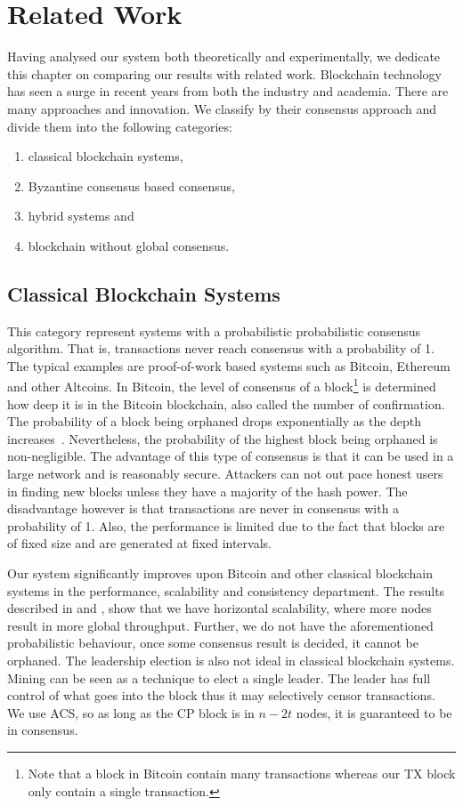 \chapter{Related Work}
\label{ch:related}

Having analysed our system both theoretically and experimentally,
we dedicate this chapter on comparing our results with related work.
Blockchain technology has seen a surge in recent years from both the industry and academia.
There are many approaches and innovation.
We classify by their consensus approach and divide them into the following categories: 
\begin{enumerate}
    \item classical blockchain systems,
    \item Byzantine consensus based consensus,
    \item hybrid systems and
    \item blockchain without global consensus.
\end{enumerate}

\section{Classical Blockchain Systems}
This category represent systems with a probabilistic probabilistic consensus algorithm.
That is, transactions never reach consensus with a probability of 1.
The typical examples are proof-of-work based systems such as Bitcoin, Ethereum and other Altcoins.
In Bitcoin, the level of consensus of a block\footnote{Note that a block in Bitcoin contain many transactions whereas our TX block only contain a single transaction.}
is determined how deep it is in the Bitcoin blockchain, also called the number of confirmation.
The probability of a block being orphaned drops exponentially as the depth increases~\cite{bitcoin}.
Nevertheless, the probability of the highest block being orphaned is non-negligible.
The advantage of this type of consensus is that it can be used in a large network and is reasonably secure.
Attackers can not out pace honest users in finding new blocks unless they have a majority of the hash power.
The disadvantage however is that transactions are never in consensus with a probability of 1.
Also, the performance is limited due to the fact that blocks are of fixed size and are generated at fixed intervals.

Our system significantly improves upon Bitcoin and other classical blockchain systems in the performance, scalability and consistency department.
The results described in  and , show that we have horizontal scalability,
where more nodes result in more global throughput.
Further, we do not have the aforementioned probabilistic behaviour,
once some consensus result is decided, it cannot be orphaned.
The leadership election is also not ideal in classical blockchain systems.
Mining can be seen as a technique to elect a single leader.
The leader has full control of what goes into the block thus it may selectively censor transactions.
We use ACS, so as long as the CP block is in $n - 2t$ nodes, it is guaranteed to be in consensus.

